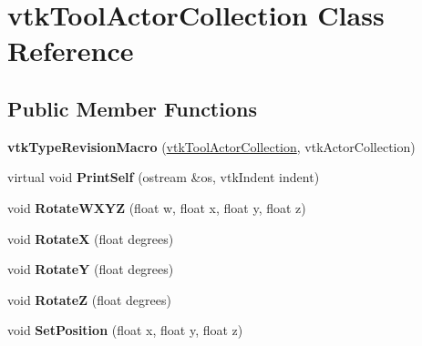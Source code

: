 \hypertarget{classvtkToolActorCollection}{
\section{vtkToolActorCollection Class Reference}
\label{classvtkToolActorCollection}
}
\subsection*{Public Member Functions}
\begin{DoxyCompactItemize}
\item 
\hypertarget{classvtkToolActorCollection_aa896e71c52fa813a1f629db00e75fba0}{
{\bfseries vtkTypeRevisionMacro} (\hyperlink{classvtkToolActorCollection}{vtkToolActorCollection}, vtkActorCollection)}
\label{classvtkToolActorCollection_aa896e71c52fa813a1f629db00e75fba0}

\item 
\hypertarget{classvtkToolActorCollection_a918e26f8a058df611f5265a6a9cfc999}{
virtual void {\bfseries PrintSelf} (ostream \&os, vtkIndent indent)}
\label{classvtkToolActorCollection_a918e26f8a058df611f5265a6a9cfc999}

\item 
\hypertarget{classvtkToolActorCollection_a6b0fe4cec3d4dfd23573d7ad66a438b8}{
void {\bfseries RotateWXYZ} (float w, float x, float y, float z)}
\label{classvtkToolActorCollection_a6b0fe4cec3d4dfd23573d7ad66a438b8}

\item 
\hypertarget{classvtkToolActorCollection_a3ccc38cf1279155501090942ad002ee3}{
void {\bfseries RotateX} (float degrees)}
\label{classvtkToolActorCollection_a3ccc38cf1279155501090942ad002ee3}

\item 
\hypertarget{classvtkToolActorCollection_ab30bc9b1fe9606ff0bb530f1f628c958}{
void {\bfseries RotateY} (float degrees)}
\label{classvtkToolActorCollection_ab30bc9b1fe9606ff0bb530f1f628c958}

\item 
\hypertarget{classvtkToolActorCollection_a537f73cc4cf05a48f24a5717a888298c}{
void {\bfseries RotateZ} (float degrees)}
\label{classvtkToolActorCollection_a537f73cc4cf05a48f24a5717a888298c}

\item 
\hypertarget{classvtkToolActorCollection_a69ca351724fe0dd36be94f9b303b97ef}{
void {\bfseries SetPosition} (float x, float y, float z)}
\label{classvtkToolActorCollection_a69ca351724fe0dd36be94f9b303b97ef}


\end{DoxyCompactItemize}

